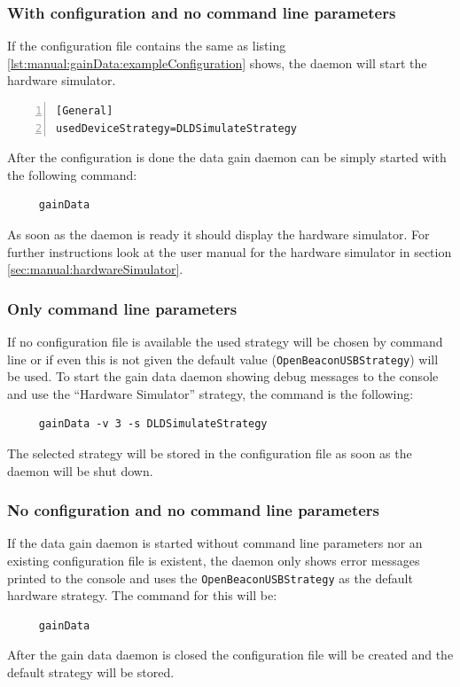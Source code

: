    \subsubsection*{With configuration and no command line parameters}
    If the configuration file contains the same as listing \ref{lst:manual:gainData:exampleConfiguration} shows, the daemon will start the hardware simulator.
    \begin{lstlisting}[frame=single,breaklines,basicstyle=\footnotesize,numbers=left,label=lst:manual:gainData:exampleConfiguration,captionpos=b,caption={Example Configuration file for the data gain daemon}]
[General]
usedDeviceStrategy=DLDSimulateStrategy
    \end{lstlisting}
    After the configuration is done the data gain daemon can be simply started with the following command:
    \begin{verbatim}
     gainData
    \end{verbatim}
    As soon as the daemon is ready it should display the hardware simulator. For further instructions look at the user manual for the hardware simulator in section \ref{sec:manual:hardwareSimulator}.

   \subsubsection*{Only command line parameters}
    If no configuration file is available the used strategy will be chosen by command line or if even this is not given the default value (\texttt{OpenBeaconUSBStrategy}) will be used. To start the gain data daemon showing debug messages to the console and use the ``Hardware Simulator'' strategy, the command is the following:
    \begin{verbatim}
     gainData -v 3 -s DLDSimulateStrategy
    \end{verbatim}
    The selected strategy will be stored in the configuration file as soon as the daemon will be shut down.

   \subsubsection*{No configuration and no command line parameters}
    If the data gain daemon is started without command line parameters nor an existing configuration file is existent, the daemon only shows error messages printed to the console and uses the \texttt{OpenBeaconUSBStrategy} as the default hardware strategy. The command for this will be:
    \begin{verbatim}
     gainData
    \end{verbatim}
    After the gain data daemon is closed the configuration file will be created and the default strategy will be stored.

